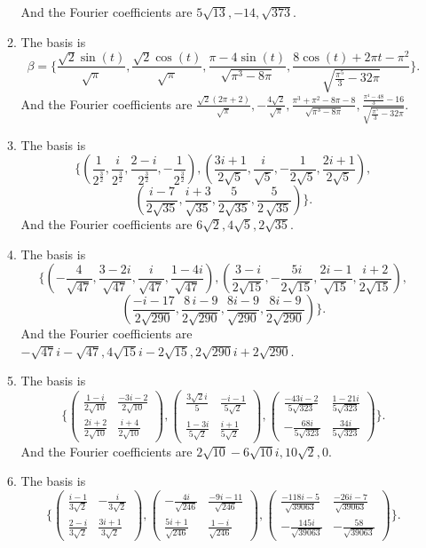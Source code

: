 \begin{enumerate}
\begin{enumerate}
And the Fourier coefficients are $5\sqrt{13},-14,\sqrt{373}$.
\item The basis is
\[\beta=\{\frac{\sqrt{2}\sin(t) }{\sqrt{\pi}},\frac{\sqrt{2}\cos(t)}{\sqrt{\pi}},\frac{\pi-4\sin(t) }{\sqrt{{\pi}^{3}-8\pi}}, \frac{8\cos(t) +2\pi t-{\pi}^{2}}{\sqrt{\frac{{\pi}^{5}}{3}-32\pi}}\}.\]
And the Fourier coefficients are $\frac{\sqrt{2}( 2\pi+2) }{\sqrt{\pi}},-\frac{4\sqrt{2}}{\sqrt{\pi}},\frac{{\pi}^{3}+{\pi}^{2}-8\pi-8}{\sqrt{{\pi}^{3}-8\pi}},\frac{\frac{{\pi}^{4}-48}{3}-16}{\sqrt{\frac{{\pi}^{5}}{3}-32\pi}}$.
\item The basis is 
\[\{(\frac{1}{{2}^{\frac{3}{2}}},\frac{i}{{2}^{\frac{3}{2}}},\frac{2-i}{{2}^{\frac{3}{2}}},-\frac{1}{{2}^{\frac{3}{2}}}),(\frac{3i+1}{2\sqrt{5}},\frac{i}{\sqrt{5}},-\frac{1}{2\sqrt{5}},\frac{2i+1}{2\sqrt{5}}),\]
\[(\frac{i-7}{2\sqrt{35}},\frac{i+3}{\sqrt{35}},\frac{5}{2\sqrt{35}},\frac{5}{2\,\sqrt{35}})\}.\]
And the Fourier coefficients are $6\sqrt{2},4\sqrt{5},2\sqrt{35}$.
\item The basis is 
\[\{(-\frac{4}{\sqrt{47}},\frac{3-2i}{\sqrt{47}},\frac{i}{\sqrt{47}},\frac{1-4i}{\sqrt{47}}),(\frac{3-i}{2\sqrt{15}},-\frac{5i}{2\sqrt{15}},\frac{2i-1}{\sqrt{15}},\frac{i+2}{2\sqrt{15}}),\]
\[(\frac{-i-17}{2\sqrt{290}},\frac{8\,i-9}{2\sqrt{290}},\frac{8i-9}{\sqrt{290}},\frac{8i-9}{2\sqrt{290}})\}.\]
And the Fourier coefficients are $-\sqrt{47}i-\sqrt{47},4\sqrt{15}i-2\sqrt{15},2\sqrt{290}i+2\sqrt{290}$.
\item The basis is 
\[\{\begin{pmatrix}\frac{1-i}{2\sqrt{10}}&\frac{-3i-2}{2\sqrt{10}}\\\frac{2i+2}{2\sqrt{10}}&\frac{i+4}{2\sqrt{10}}\end{pmatrix},\begin{pmatrix}\frac{3\sqrt{2}i}{5}&\frac{-i-1}{5\sqrt{2}}\\\frac{1-3i}{5\sqrt{2}}&\frac{i+1}{5\sqrt{2}}\end{pmatrix},\begin{pmatrix}\frac{-43i-2}{5\sqrt{323}}&\frac{1-21i}{5\sqrt{323}}\\-\frac{68i}{5\sqrt{323}}&\frac{34i}{5\sqrt{323}}\end{pmatrix}\}.\]
And the Fourier coefficients are $2\sqrt{10}-6\sqrt{10}i,10\sqrt{2},0$.
\item The basis is 
\[\{\begin{pmatrix}\frac{i-1}{3\sqrt{2}}&-\frac{i}{3\sqrt{2}}\\\frac{2-i}{3\sqrt{2}}&\frac{3i+1}{3\sqrt{2}}\end{pmatrix},\begin{pmatrix}-\frac{4i}{\sqrt{246}}&\frac{-9i-11}{\sqrt{246}}\\\frac{5i+1}{\sqrt{246}}&\frac{1-i}{\sqrt{246}}\end{pmatrix},\begin{pmatrix}\frac{-118i-5}{\sqrt{39063}}&\frac{-26i-7}{\sqrt{39063}}\\-\frac{145i}{\sqrt{39063}}&-\frac{58}{\sqrt{39063}}\end{pmatrix}\}.\]

\end{enumerate}
\end{enumerate}
